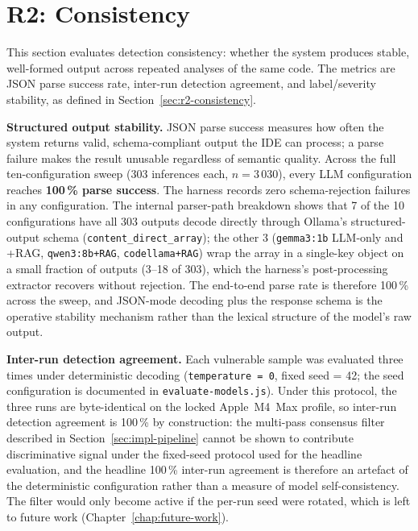 \section{R2: Consistency}
\label{sec:eval-r2}

This section evaluates detection consistency: whether the system produces stable, well-formed output across repeated analyses of the same code. The metrics are JSON parse success rate, inter-run detection agreement, and label/severity stability, as defined in Section~\ref{sec:r2-consistency}.

\noindent\textbf{Structured output stability.} JSON parse success measures how often the system returns valid, schema-compliant output the IDE can process; a parse failure makes the result unusable regardless of semantic quality. Across the full ten-configuration sweep (303 inferences each, $n = 3\,030$), every LLM configuration reaches \textbf{100\,\% parse success}. The harness records zero schema-rejection failures in any configuration. The internal parser-path breakdown shows that 7 of the 10 configurations have all 303 outputs decode directly through Ollama's structured-output schema (\texttt{content\_direct\_array}); the other 3 (\texttt{gemma3:1b} LLM-only and +RAG, \texttt{qwen3:8b+RAG}, \texttt{codellama+RAG}) wrap the array in a single-key object on a small fraction of outputs (3--18 of 303), which the harness's post-processing extractor recovers without rejection. The end-to-end parse rate is therefore 100\,\% across the sweep, and JSON-mode decoding plus the response schema is the operative stability mechanism rather than the lexical structure of the model's raw output.

\noindent\textbf{Inter-run detection agreement.} Each vulnerable sample was evaluated three times under deterministic decoding (\texttt{temperature = 0}, fixed seed = 42; the seed configuration is documented in \texttt{evaluate-models.js}). Under this protocol, the three runs are byte-identical on the locked Apple~M4~Max profile, so inter-run detection agreement is 100\,\% by construction: the multi-pass consensus filter described in Section~\ref{sec:impl-pipeline} cannot be shown to contribute discriminative signal under the fixed-seed protocol used for the headline evaluation, and the headline 100\,\% inter-run agreement is therefore an artefact of the deterministic configuration rather than a measure of model self-consistency. The filter would only become active if the per-run seed were rotated, which is left to future work (Chapter~\ref{chap:future-work}).

